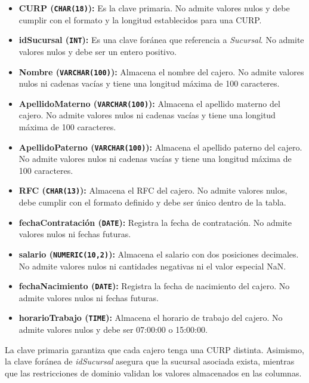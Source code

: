 \begin{itemize}
    \item \textbf{CURP (\texttt{CHAR(18)}):} Es la clave primaria. No admite valores nulos y debe cumplir con el formato y la longitud establecidos para una CURP.

    \item \textbf{idSucursal (\texttt{INT}):} Es una clave foránea que referencia a \textit{Sucursal}. No admite valores nulos y debe ser un entero positivo.

    \item \textbf{Nombre (\texttt{VARCHAR(100)}):} Almacena el nombre del cajero. No admite valores nulos ni cadenas vacías y tiene una longitud máxima de 100 caracteres.

    \item \textbf{ApellidoMaterno (\texttt{VARCHAR(100)}):} Almacena el apellido materno del cajero. No admite valores nulos ni cadenas vacías y tiene una longitud máxima de 100 caracteres.

    \item \textbf{ApellidoPaterno (\texttt{VARCHAR(100)}):} Almacena el apellido paterno del cajero. No admite valores nulos ni cadenas vacías y tiene una longitud máxima de 100 caracteres.

    \item \textbf{RFC (\texttt{CHAR(13)}):} Almacena el RFC del cajero. No admite valores nulos, debe cumplir con el formato definido y debe ser único dentro de la tabla.

    \item \textbf{fechaContratación (\texttt{DATE}):} Registra la fecha de contratación. No admite valores nulos ni fechas futuras.

    \item \textbf{salario (\texttt{NUMERIC(10,2)}):} Almacena el salario con dos posiciones decimales. No admite valores nulos ni cantidades negativas ni el valor especial NaN.

    \item \textbf{fechaNacimiento (\texttt{DATE}):} Registra la fecha de nacimiento del cajero. No admite valores nulos ni fechas futuras.

    \item \textbf{horarioTrabajo (\texttt{TIME}):} Almacena el horario de trabajo del cajero. No admite valores nulos y debe ser 07:00:00 o 15:00:00.
\end{itemize}

La clave primaria garantiza que cada cajero tenga una CURP distinta. Asimismo, la clave foránea de \textit{idSucursal} asegura que la sucursal asociada exista, mientras que las restricciones de dominio validan los valores almacenados en las columnas.

